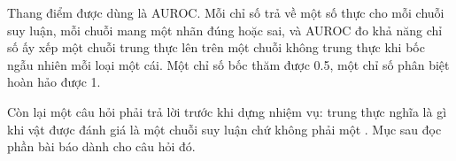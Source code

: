 Thang điểm được dùng là AUROC. Mỗi chỉ số trả về một số thực cho mỗi chuỗi suy
luận, mỗi chuỗi mang một nhãn đúng hoặc sai, và AUROC đo khả năng chỉ số ấy
xếp một chuỗi trung thực lên trên một chuỗi không trung thực khi bốc ngẫu
nhiên mỗi loại một cái. Một chỉ số bốc thăm được 0.5, một chỉ số phân biệt
hoàn hảo được 1.

Còn lại một câu hỏi phải trả lời trước khi dựng nhiệm vụ: trung thực nghĩa là
gì khi vật được đánh giá là một chuỗi suy luận chứ không phải một
.
Mục sau đọc phần bài báo dành cho câu hỏi đó.
